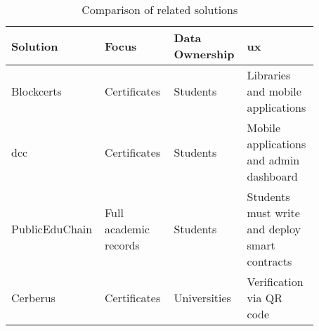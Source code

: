 \begin{table}
\centering
\caption{Comparison of related solutions}
\label{tab:relSolutions}
\begin{tabular}{|p{0.20\linewidth}|p{0.22\linewidth}|p{0.22\linewidth}|p{0.23\linewidth}|}
\hline
\textbf{Solution} & \textbf{Focus} & \textbf{Data Ownership} & \textbf{\acrshort{ux}} \\
\hline
Blockcerts & Certificates & Students & Libraries and mobile applications \\
\hline
\acrshort{dcc} & Certificates & Students & Mobile applications and admin dashboard \\
\hline
PublicEduChain & Full academic records & Students & Students must write and deploy smart contracts \\
\hline
Cerberus & Certificates & Universities & Verification via QR code \\
\hline
\end{tabular}
\end{table}

